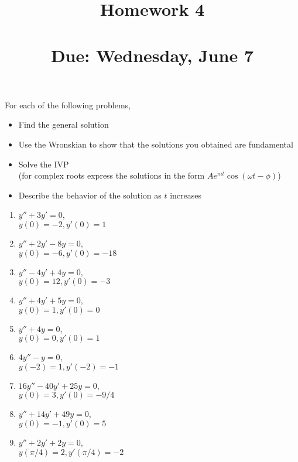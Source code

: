 


\title{Homework 4 \\ \hfill \\ Due: Wednesday, June 7}


\maketitle

\thispagestyle{fancy}






For each of the following problems,
\begin{itemize}
	\item Find the general solution
	\item Use the Wronskian to show that the solutions you obtained are fundamental
	\item Solve the IVP \\(for complex roots express the solutions in the form $ A e^{mt} \cos (\omega t - \phi) $)
	\item Describe the behavior of the solution as $ t $ increases
\end{itemize}
\vspace{1em}


\begin{enumerate}
	\item $ y'' + 3y' = 0$, \\$ y(0) = -2, y'(0) = 1 $
	\item $ y'' + 2y' - 8y = 0$,\\ $ y(0) = -6, y'(0) = -18$
	\item $ y'' - 4y' + 4y = 0$,\\ $ y(0) = 12, y'(0) = -3 $%
	\item $ y'' + 4y' + 5y = 0$,\\ $ y(0) = 1, y'(0) = 0 $%
	\item $ y'' + 4y = 0$,\\ $ y(0) = 0 , y'(0) = 1 $%
	\item $4y'' - y = 0$,\\ $y(-2) = 1, y'(-2) = -1$
	\item $ 16y'' - 40 y' + 25y = 0 $,\\ $ y(0) = 3  , y'(0) = -9/4 $%
	\item $ y'' + 14y'+49y = 0$,\\ $ y(0) = -1, y'(0) = 5 $%
	\item $ y'' + 2y' + 2y = 0$,\\ $ y(\pi/4) = 2, y'(\pi/4) = -2$ %
\end{enumerate}





